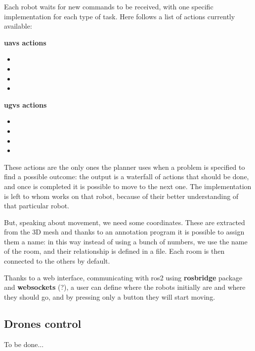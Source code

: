 Each robot waits for new commands to be received, with one specific implementation for each type of task. Here follows a list of actions currently available:

\bigskip

\begin{minipage}[h]{0.45\textwidth}
  \centering
  \textbf{\acrshort{uav}s actions}
  \begin{itemize}
    \centering
    \item {}
    \item {}    
    \item {}
    \item {}
  \end{itemize}
\end{minipage}
\begin{minipage}[h]{0.45\textwidth}
  \centering
  \textbf{\acrshort{ugv}s actions}
    \begin{itemize}
      \centering
      \item {}
      \item {}
      \item {}
      \item {}
    \end{itemize}
\end{minipage}

\bigskip

These actions are the only ones the planner uses when a problem is specified to find a possible outcome: the output is a waterfall of actions that should be done, and once is completed it is possible to move to the next one. The implementation is left to whom works on that robot, because of their better understanding of that particular robot.

But, speaking about movement, we need some coordinates. These are extracted from the 3D mesh and thanks to an annotation program it is possible to assign them a name: in this way instead of using a bunch of numbers, we use the name of the room, and their relationship is defined in a file. Each room is then connected to the others by default.

Thanks to a web interface, communicating with \acrshort{ros}2 using \textbf{rosbridge} package and \textbf{websockets} (?), a user can define where the robots initially are and where they should go, and by pressing only a button they will start moving.   

\subsection{Drones control}

To be done...
